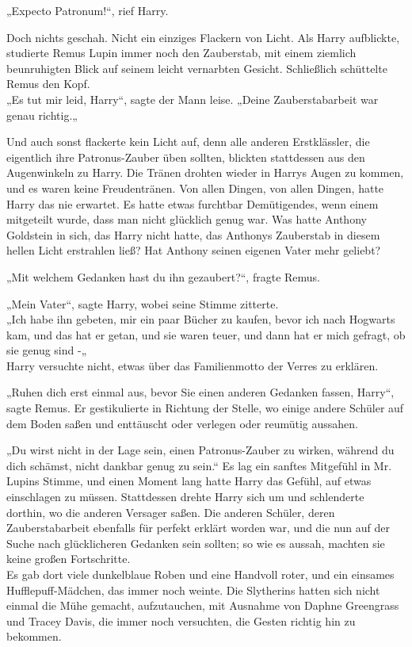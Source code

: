 {„Expecto Patronum!“, rief Harry.

Doch nichts geschah. Nicht ein einziges Flackern von Licht. Als Harry aufblickte, studierte Remus Lupin immer noch den Zauberstab, mit einem ziemlich beunruhigten Blick auf seinem leicht vernarbten Gesicht. Schließlich schüttelte Remus den Kopf.\\ „Es tut mir leid, Harry“, sagte der Mann leise. „Deine Zauberstabarbeit war genau richtig.„

Und auch sonst flackerte kein Licht auf, denn alle anderen Erstklässler, die eigentlich ihre Patronus-Zauber üben sollten, blickten stattdessen aus den Augenwinkeln zu Harry. Die Tränen drohten wieder in Harrys Augen zu kommen, und es waren keine Freudentränen. Von allen Dingen, von allen Dingen, hatte Harry das nie erwartet. Es hatte etwas furchtbar Demütigendes, wenn einem mitgeteilt wurde, dass man nicht glücklich genug war. Was hatte Anthony Goldstein in sich, das Harry nicht hatte, das Anthonys Zauberstab in diesem hellen Licht erstrahlen ließ? Hat Anthony seinen eigenen Vater mehr geliebt?

„Mit welchem Gedanken hast du ihn gezaubert?“, fragte Remus.

„Mein Vater“, sagte Harry, wobei seine Stimme zitterte.\\ „Ich habe ihn gebeten, mir ein paar Bücher zu kaufen, bevor ich nach Hogwarts kam, und das hat er getan, und sie waren teuer, und dann hat er mich gefragt, ob sie genug sind -„\\ Harry versuchte nicht, etwas über das Familienmotto der Verres zu erklären.

„Ruhen dich erst einmal aus, bevor Sie einen anderen Gedanken fassen, Harry“, sagte Remus. Er gestikulierte in Richtung der Stelle, wo einige andere Schüler auf dem Boden saßen und enttäuscht oder verlegen oder reumütig aussahen.

„Du wirst nicht in der Lage sein, einen Patronus-Zauber zu wirken, während du dich schämst, nicht dankbar genug zu sein.“ Es lag ein sanftes Mitgefühl in Mr. Lupins Stimme, und einen Moment lang hatte Harry das Gefühl, auf etwas einschlagen zu müssen. Stattdessen drehte Harry sich um und schlenderte dorthin, wo die anderen Versager saßen. Die anderen Schüler, deren Zauberstabarbeit ebenfalls für perfekt erklärt worden war, und die nun auf der Suche nach glücklicheren Gedanken sein sollten; so wie es aussah, machten sie keine großen Fortschritte.\\ Es gab dort viele dunkelblaue Roben und eine Handvoll roter, und ein einsames Hufflepuff-Mädchen, das immer noch weinte. Die Slytherins hatten sich nicht einmal die Mühe gemacht, aufzutauchen, mit Ausnahme von Daphne Greengrass und Tracey Davis, die immer noch versuchten, die Gesten richtig hin zu bekommen.

}
